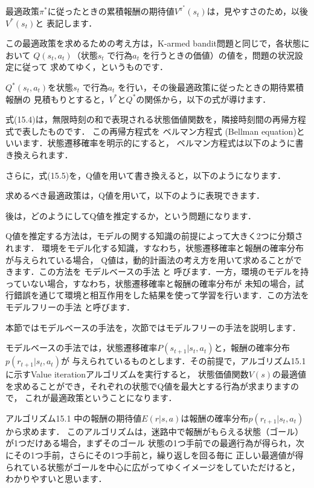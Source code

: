 
最適政策$\pi^*$に従ったときの累積報酬の期待値$V^{\pi^*} (s_t)$は，見やすさのため，以後$V^* (s_t)$と
表記します．

この最適政策を求めるための考え方は，K-armed bandit問題と同じで，各状態において
$Q(s_t, a_t)$（状態$s_t$ で行為$a_t$ を行うときの価値）の値を，問題の状況設定に従って
求めてゆく，というものです．

$Q^*(s_t, a_t)$を状態$s_t$ で行為$a_t$ を行い，その後最適政策に従ったときの期待累積報酬の
見積もりとすると，$V^*$と$Q^*$の関係から，以下の式が導けます．


式(15.4)は，無限時刻の和で表現される状態価値関数を，隣接時刻間の再帰方程式で表したものです．
この再帰方程式を
ベルマン方程式 
(Bellman equation)といいます．状態遷移確率を明示的にすると，
ベルマン方程式は以下のように書き換えられます．

さらに，式(15.5)を，Q値を用いて書き換えると，以下のようになります．

求めるべき最適政策は，Q値を用いて，以下のように表現できます．

後は，どのようにしてQ値を推定するか，という問題になります．


Q値を推定する方法は，モデルの関する知識の前提によって大きく2つに分類されます．
環境をモデル化する知識，すなわち，状態遷移確率と報酬の確率分布が与えられている場合，
Q値は，動的計画法の考え方を用いて求めることができます．この方法を
モデルベースの手法 と
呼びます．一方，環境のモデルを持っていない場合，すなわち，状態遷移確率と報酬の確率分布が
未知の場合，試行錯誤を通じて環境と相互作用をした結果を使って学習を行います．この方法を
モデルフリーの手法 と呼びます．

本節ではモデルベースの手法を，次節ではモデルフリーの手法を説明します．

モデルベースの手法では，状態遷移確率$P(s_{t+1}|s_t, a_t)$と，報酬の確率分布$p(r_{t+1}|s_t, a_t)$が
与えられているものとします．その前提で，アルゴリズム15.1に示すValue iterationアルゴリズムを実行すると，
状態価値関数$V(s)$の最適値を求めることができ，それぞれの状態でQ値を最大とする行為が求まりますので，
これが最適政策ということになります．

アルゴリズム15.1 中の報酬の期待値$E(r|s,a)$は報酬の確率分布$p(r_{t+1}|s_t, a_t)$から求めます．
このアルゴリズムは，迷路中で報酬がもらえる状態（ゴール）が1つだけある場合，まずそのゴール
状態の1つ手前での最適行為が得られ，次にその1つ手前，さらにその1つ手前と，繰り返しを回る毎に
正しい最適値が得られている状態がゴールを中心に広がってゆくイメージをしていただけると，
わかりやすいと思います．

